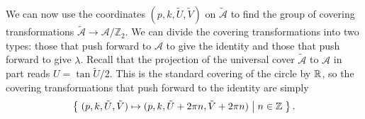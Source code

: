 \documentclass{article}
\begin{document}

We can now use the coordinates $(p,k,\tilde{U},\tilde{V})$ on $\mathcal{\tilde{A}}$ to find the group of covering transformations $\mathcal{\tilde{A}} \to \mathcal{A}/\mathbb{Z}_2$. We can divide the covering transformations into two types: those that push forward to $\mathcal{A}$ to give the identity and those that push forward to give $\lambda$. Recall that the projection of the universal cover $\mathcal{\tilde{A}}$ to $\mathcal{A}$ in part reads $U = \tan \tilde{U}/2$. This is the standard covering of the circle by $\mathbb{R}$, so the covering transformations that push forward to the identity are simply
\[
\left\{\;  (p,k,\tilde{U},\tilde{V}) \mapsto (p,k,\tilde{U} + 2\pi n,\tilde{V} +2\pi n)  \;\middle|\;  n \in \mathbb{Z}  \;\right\}.
\]
\end{document}
